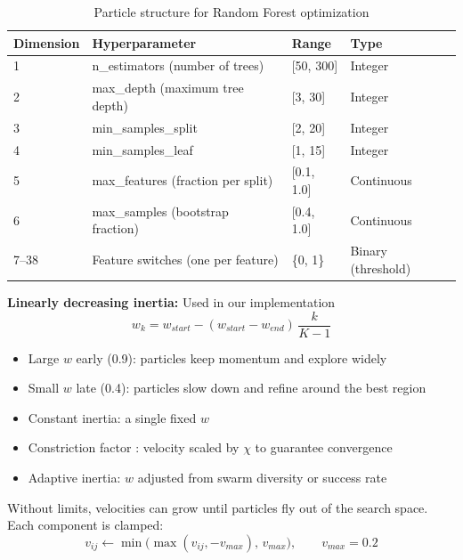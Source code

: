 \begin{table}[H]
\centering
\caption{Particle structure for Random Forest optimization}
\begin{tabular}{|l|l|l|l|}
\hline
\textbf{Dimension} & \textbf{Hyperparameter} & \textbf{Range} & \textbf{Type} \\ \hline
1 & n\_estimators (number of trees) & [50, 300] & Integer \\
2 & max\_depth (maximum tree depth) & [3, 30] & Integer \\
3 & min\_samples\_split & [2, 20] & Integer \\
4 & min\_samples\_leaf & [1, 15] & Integer \\
5 & max\_features (fraction per split) & [0.1, 1.0] & Continuous \\
6 & max\_samples (bootstrap fraction) & [0.4, 1.0] & Continuous \\
7--38 & Feature switches (one per feature) & \{0, 1\} & Binary (threshold) \\ \hline
\end{tabular}
\end{table}

\textbf{Linearly decreasing inertia:} Used in our implementation \cite{shi1998}
\begin{equation}
w_k = w_{start} - (w_{start} - w_{end})\,\frac{k}{K-1}
\end{equation}
\begin{itemize}
\item Large $w$ early (0.9): particles keep momentum and explore widely
\item Small $w$ late (0.4): particles slow down and refine around the best region
\end{itemize}
\begin{itemize}
\item Constant inertia: a single fixed $w$
\item Constriction factor \cite{clerc2002}: velocity scaled by $\chi$ to guarantee convergence
\item Adaptive inertia: $w$ adjusted from swarm diversity or success rate
\end{itemize}

Without limits, velocities can grow until particles fly out of the search space. Each component is clamped:
\begin{equation}
v_{ij} \gets \min\big(\max(v_{ij}, -v_{max}),\, v_{max}\big), \qquad v_{max} = 0.2
\end{equation}

